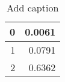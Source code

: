 \begin{table}[htbp]
  \centering
  \caption{Add caption}
    \begin{tabular}{rr}
    \toprule
    0     & 0.0061 \\
    \midrule
    1     & 0.0791 \\
    2     & 0.6362 \\
    \bottomrule
    \end{tabular}%
  \label{tab:addlabel}%
\end{table}%

